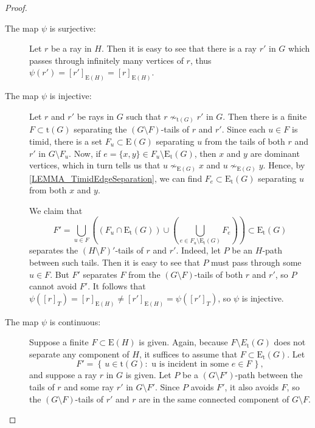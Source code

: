 \documentclass[10pt]{article}
\newcommand{\myref}[1]{\hyperref[#1]{\namecref{#1} \ref{#1}}}
\numberwithin{equation}{subsection}
\theoremstyle{remark}
\newcommand{\set}[1]{\left\{\, {#1} \,\right\}}
\begin{document}
\begin{proof}
\begin{description}
        \item[The map $\psi$ is surjective:] Let $r$ be a ray in $H$. Then it is easy to see that there is a ray $r'$ in $G$ which passes through infinitely many vertices of $r$, thus $\psi(r') = [r']_{\mathrm{E}(H)} = [r]_{\mathrm{E}(H)}$.

        \item[The map $\psi$ is injective:] Let $r$ and $r'$ be rays in $G$ such that $r\nsim_{\mathrm{t}(G)} r'$ in $G$. Then there is a finite $F\subset \mathrm{t}(G)$ separating the $(G\setminus F)$-tails of $r$ and $r'$. Since each $u\in F$ is timid, there is a set $F_u\subset \mathrm{E}(G)$ separating $u$ from the tails of both $r$ and $r'$ in $G\setminus F_u$. Now, if $e=\{x,y\}\in F_u\setminus \mathrm{E}_\mathrm{t}(G)$, then $x$ and $y$ are dominant vertices, which in turn tells us that $u\nsim_{\mathrm{E}(G)} x$ and $u\nsim_{\mathrm{E}(G)} y$. Hence, by \myref{LEMMA_TimidEdgeSeparation}, we can find $F_e\subset \mathrm{E}_\mathrm{t}(G)$ separating $u$ from both $x$ and $y$. 
        
        We claim that 
        \[F' = \bigcup_{u\in F}\left((F_u\cap \mathrm{E}_\mathrm{t}(G))\cup \left(\bigcup_{e\in F_u\setminus \mathrm{E}_\mathrm{t}(G)}F_e\right)\right)\subset \mathrm{E}_\mathrm{t}(G)\]
        separates the $(H\setminus F)'$-tails of $r$ and $r'$. Indeed, let $P$ be an $H$-path between such tails. Then it is easy to see that $P$ must pass through some $u\in F$. But $F'$ separates $F$ from the $(G\setminus F)$-tails of both $r$ and $r'$, so $P$ cannot avoid $F'$. It follows that $\psi([r]_{T}) = [r]_{\mathrm{E}(H)} \neq [r']_{\mathrm{E}(H)} = \psi([r']_{T})$, so $\psi$ is injective.

        \item[The map $\psi$ is continuous:] Suppose a finite $F\subset \mathrm{E}(H)$ is given. Again, because $F\setminus E_\mathrm{t}(G)$ does not separate any component of $H$, it suffices to assume that $F\subset \mathrm{E}_\mathrm{t}(G)$. Let \[F' = \set{u\in \mathrm{t}(G): \text{ u is incident in some $e\in F$}},\] and suppose a ray $r$ in $G$ is given. Let $P$ be a $(G\setminus F')$-path between the tails of $r$ and some ray $r'$ in $G\setminus F'$. Since $P$ avoids $F'$, it also avoids $F$, so the $(G\setminus F)$-tails of $r'$ and $r$ are in the same connected component of $G\setminus F$.


\end{description}
\end{proof}
\end{document}
